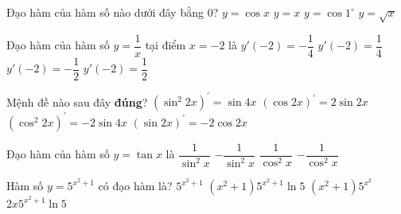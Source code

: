 \begin{ex}%
	Đạo hàm của hàm số nào  dưới đây bằng $0$?
	\choice 
		{$y=\cos x$} 
		 {$y=x$}
		{\True $y=\cos 1^{\circ}$} 
		 {$y=\sqrt{x}$}
\end{ex}

\begin{ex}%
	Đạo hàm của hàm số $y=\dfrac{1}{x}$ tại  điểm $x=-2$ là
	 \choice
		 {\True $y'\left(-2\right)=-\dfrac{1}{4}$}
		 {$y'\left(-2\right)=\dfrac{1}{4}$}
		 {$y'\left(-2\right)=-\dfrac{1}{2}$}
		 {$y'\left(-2\right)=\dfrac{1}{2}$}
\end{ex}

\begin{ex}%
	Mệnh đề nào sau đây {\bf đúng}? 
	 \choice
		{$\left(\sin^2{2x}\right)^\prime  = \sin4x$}
		{$\left(\cos{2x}\right)^\prime  = 2\sin2x$}
		{\True  $\left(\cos^2{2x}\right)^\prime = -2\sin4x$}
		{$\left(\sin{2x}\right)^\prime  =-2 \cos2x$}
\end{ex}

\begin{ex}%
	Đạo hàm  của hàm số $y=\tan x$ là
	\choice 
		 {$\dfrac{1}{\sin^2 x}$}
		 {$-\dfrac{1}{\sin^2 x}$}
		{\True  $\dfrac{1}{\cos^2 x}$}
		{$-\dfrac{1}{\cos^2 x}$} 
\end{ex}

\begin{ex}%
	Hàm số $y=5^{x^2+1}$ có đạo hàm  là?
	 \choice
		{$5^{x^2+1}$} 
		{$\left(x^2+1\right) 5^{x^2+1}\ln 5$} 
		 {$\left(x^2+1\right) 5^{x^2}$}
		{\True $2x  5^{x^2+1}\ln 5$}
\end{ex}

